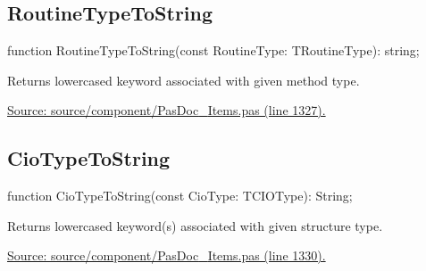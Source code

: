 \documentclass{report}
\newif\ifpdf
\begin{document}
\subsection*{RoutineTypeToString}
\fi
\label{PasDoc_Items-RoutineTypeToString}
\begin{list}{}{
\setlength{\itemindent}{0cm}
\setlength{\listparindent}{0cm}
\setlength{\leftmargin}{\evensidemargin}
\addtolength{\leftmargin}{\tmplength}
\settowidth{\labelsep}{X}
\addtolength{\leftmargin}{\labelsep}
\setlength{\labelwidth}{\tmplength}
}
\item[\textbf{Declaration}\hfill]
\ifpdf
\begin{flushleft}
\fi
\begin{ttfamily}
function RoutineTypeToString(const RoutineType: TRoutineType): string;\end{ttfamily}

\ifpdf
\end{flushleft}
\fi

\par
\item[\textbf{Description}]
Returns lowercased keyword associated with given method type.\par
\href{https://github.com/pasdoc/pasdoc/blob/master/source/component/PasDoc_Items.pas#L1327}{Source: source/component/PasDoc{\_}Items.pas (line 1327).}

\end{list}
\ifpdf
\subsection*{\large{\textbf{CioTypeToString}}\normalsize\hspace{1ex}\hrulefill}
\else
\subsection*{CioTypeToString}
\fi
\label{PasDoc_Items-CioTypeToString}
\begin{list}{}{
\setlength{\itemindent}{0cm}
\setlength{\listparindent}{0cm}
\setlength{\leftmargin}{\evensidemargin}
\addtolength{\leftmargin}{\tmplength}
\settowidth{\labelsep}{X}
\addtolength{\leftmargin}{\labelsep}
\setlength{\labelwidth}{\tmplength}
}
\item[\textbf{Declaration}\hfill]
\ifpdf
\begin{flushleft}
\fi
\begin{ttfamily}
function CioTypeToString(const CioType: TCIOType): String;\end{ttfamily}

\ifpdf
\end{flushleft}
\fi

\par
\item[\textbf{Description}]
Returns lowercased keyword(s) associated with given structure type.\par
\href{https://github.com/pasdoc/pasdoc/blob/master/source/component/PasDoc_Items.pas#L1330}{Source: source/component/PasDoc{\_}Items.pas (line 1330).}

\end{list}
\ifpdf
\end{document}
